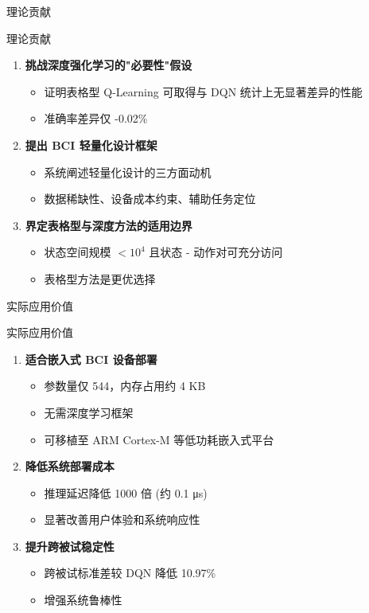 \documentclass[aspectratio=169, 10pt]{beamer}
\begin{document}
\begin{frame}{理论贡献}
\begin{block}{理论贡献}
\begin{enumerate}
    \item \textbf{挑战深度强化学习的"必要性"假设}
    \begin{itemize}
        \item 证明表格型 Q-Learning 可取得与 DQN 统计上无显著差异的性能
        \item 准确率差异仅 -0.02\%
    \end{itemize}
    
    \item \textbf{提出 BCI 轻量化设计框架}
    \begin{itemize}
        \item 系统阐述轻量化设计的三方面动机
        \item 数据稀缺性、设备成本约束、辅助任务定位
    \end{itemize}
    
    \item \textbf{界定表格型与深度方法的适用边界}
    \begin{itemize}
        \item 状态空间规模 $< 10^4$ 且状态 - 动作对可充分访问
        \item 表格型方法是更优选择
    \end{itemize}
\end{enumerate}
\end{block}
\end{frame}

\begin{frame}{实际应用价值}
\begin{block}{实际应用价值}
\begin{enumerate}
    \item \textbf{适合嵌入式 BCI 设备部署}
    \begin{itemize}
        \item 参数量仅 544，内存占用约 4 KB
        \item 无需深度学习框架
        \item 可移植至 ARM Cortex-M 等低功耗嵌入式平台
    \end{itemize}
    
    \item \textbf{降低系统部署成本}
    \begin{itemize}
        \item 推理延迟降低 1000 倍 (约 0.1 μs)
        \item 显著改善用户体验和系统响应性
    \end{itemize}
    
    \item \textbf{提升跨被试稳定性}
    \begin{itemize}
        \item 跨被试标准差较 DQN 降低 10.97\%
        \item 增强系统鲁棒性
    \end{itemize}
\end{enumerate}
\end{block}
\end{frame}
\end{document}
